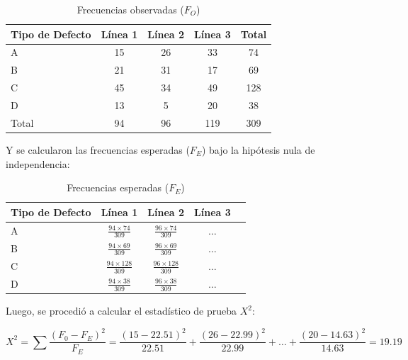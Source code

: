\documentclass{article}
\begin{document}
\begin{table}[h]
    \centering
    \begin{tabular}{l c c c c}
        \hline
        Tipo de Defecto & Línea 1 & Línea 2 & Línea 3 & Total \\
        \hline
        A               & 15      & 26      & 33      & 74    \\
        B               & 21      & 31      & 17      & 69    \\
        C               & 45      & 34      & 49      & 128   \\
        D               & 13      & 5       & 20      & 38    \\
        \hline
        Total           & 94      & 96      & 119     & 309   \\
        \hline
    \end{tabular}
    \caption{Frecuencias observadas (\( F_O \))}
\end{table}

Y se calcularon las frecuencias esperadas (\( F_E \)) bajo la hipótesis nula de independencia:

\begin{table}[h]
    \centering
    \begin{tabular}{l c c c c}
        \hline
        Tipo de Defecto & Línea 1                         & Línea 2                         & Línea 3      \\
        \hline
        A               & \( \frac{94 \times 74}{309} \)  & \( \frac{96 \times 74}{309} \)  & \( \ldots \) \\
        B               & \( \frac{94 \times 69}{309} \)  & \( \frac{96 \times 69}{309} \)  & \( \ldots \) \\
        C               & \( \frac{94 \times 128}{309} \) & \( \frac{96 \times 128}{309} \) & \( \ldots \) \\
        D               & \( \frac{94 \times 38}{309} \)  & \( \frac{96 \times 38}{309} \)  & \( \ldots \) \\
        \hline
    \end{tabular}
    \caption{Frecuencias esperadas (\( F_E \))}
\end{table}

Luego, se procedió a calcular el estadístico de prueba \( X^2 \):

\begin{equation}
    X^2 = \sum \frac{(F_0 - F_E)^2}{F_E} = \frac{(15-22.51)^2}{22.51} + \frac{(26-22.99)^2}{22.99} + \ldots + \frac{(20-14.63)^2}{14.63} = 19.19
\end{equation}
\end{document}
